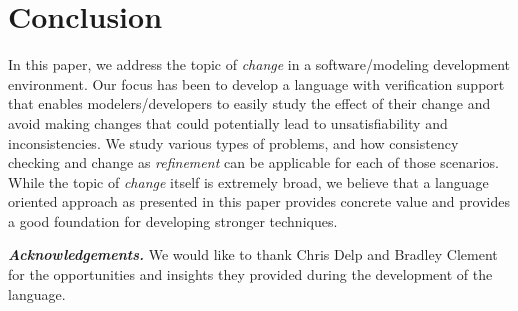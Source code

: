 
\section{Conclusion}
\label{sec:conclusion}

In this paper, we address the topic of {\em change} in a
software/modeling development environment. Our focus has been to
develop a language with verification support that enables
modelers/developers to easily study the effect of their change and
avoid making changes that could potentially lead to unsatisfiability
and inconsistencies. We study various types of problems, and how
consistency checking and change as {\em refinement} can be applicable
for each of those scenarios. While the topic of {\em change} itself is
extremely broad, we believe that a language oriented approach as
presented in this paper provides concrete value and provides a good
foundation for developing stronger techniques.

\noindent \textbf{\em Acknowledgements.} We would like to thank
Chris Delp and Bradley Clement for the opportunities and insights they
provided during the development of the \Klang{} language.
